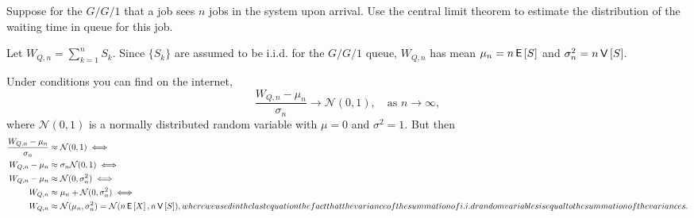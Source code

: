 \begin{exercise}
 Suppose for the $G/G/1$ that a job sees $n$ jobs in the system upon arrival.
 Use the central limit theorem to estimate the distribution of the waiting time in queue for this job.
\begin{hint}
 Let $W_{Q,n} = \sum_{k=1}^n S_k$.
 Since $\{S_k\}$ are assumed to be i.i.d.
 for the $G/G/1$ queue, $W_{Q,n}$ has mean $\mu_n = n \,\mathsf{E}\left[S\right]$ and $\sigma_n^2 = n\,\mathsf{V}\left[S\right]$.
\end{hint}
\begin{solution} Under conditions you can find on the internet,
 \begin{equation*}
 \frac{W_{Q,n} - \mu_n}{\sigma_n} \to \mathcal{N}(0,1), \quad\text{as } n\to \infty,
 \end{equation*}
 where $\mathcal{N}(0,1)$ is a normally distributed random variable
 with $\mu=0$ and $\sigma^2=1$. But then 
 \begin{align*}
 \frac{W_{Q,n} - \mu_n}{\sigma_n} &\approx \mathcal{N}(0,1) \iff\\
 W_{Q,n} - \mu_n &\approx \sigma_n \mathcal{N}(0,1) \iff\\
 W_{Q,n} - \mu_n &\approx \mathcal{N}(0,\sigma_n^2) \iff\\
 W_{Q,n} &\approx \mu_n + \mathcal{N}(0,\sigma_n^2) \iff\\
 W_{Q,n} &\approx \mathcal{N}(\mu_n,\sigma_n^2) = \mathcal{N}(n\,\mathsf{E}\left[X\right], n \,\mathsf{V}\left[S\right]),
 where we used in the last equation the fact that the variance of the summation of i.i.d random variables is equal to the summation of the variances.
 \end{align*}
\end{solution}
\end{exercise}




